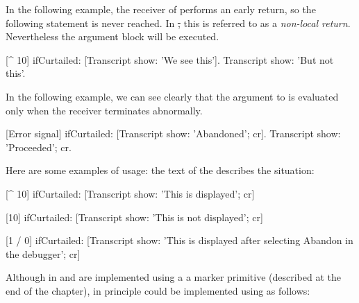 In the following example, the receiver of  performs an early return, so the following statement is never reached.
In \st, this is referred to as a \emph{non-local return}.
Nevertheless the argument block will be executed.
\begin{code}{}
[^ 10] ifCurtailed: [Transcript show: 'We see this'].
Transcript show: 'But not this'.
\end{code}

In the following example, we can see clearly that the argument to  is evaluated only when the receiver terminates abnormally.
\begin{code}{}
[Error signal] ifCurtailed: [Transcript show: 'Abandoned'; cr].
Transcript show: 'Proceeded'; cr.
\end{code}


Here are some  examples of  usage: the text of the  describes the situation:

\begin{code}{}
[^ 10] ifCurtailed: [Transcript show: 'This is displayed'; cr] 

[10] ifCurtailed: [Transcript show: 'This is not displayed'; cr] 

[1 / 0] ifCurtailed: [Transcript show: 'This is displayed after selecting Abandon in the debugger'; cr]
\end{code}

Although in \pharo {} and  are implemented using a a marker primitive (described at the end of the chapter), 
in principle  could be implemented using  as follows:

